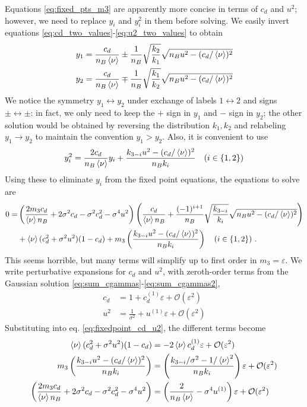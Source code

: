 Equations \eqref{eq:fixed_pts_m3} are apparently more concise in terms of $c_d$ and $u^2$; however, we need to replace $y_i$ and $y_i^2$ in them before solving. We easily invert equations \eqref{eq:cd_two_values}-\eqref{eq:u2_two_values} to obtain
\begin{align}
	y_1 &= \frac{c_d}{n_B \braket{\nu}} \pm \frac{1}{n_B} \sqrt{\frac{k_2}{k_1}}\sqrt{n_B u^2 - (c_d/\braket{\nu})^2}	\label{eq:y1_from_cd_u2} \\
	y_2 &= \frac{c_d}{n_B \braket{\nu}} \mp \frac{1}{n_B} \sqrt{\frac{k_1}{k_2}}\sqrt{n_B u^2 - (c_d/\braket{\nu})^2}	\label{eq:y2_from_cd_u2}
\end{align}
We notice the symmetry $y_1 \leftrightarrow y_2 $ under exchange of labels $1 \leftrightarrow 2$ and signs $\pm \leftrightarrow \pm$: in fact, we only need to keep the $+$ sign in $y_1$ and $-$ sign in $y_2$; the other solution would be obtained by reversing the distribution $k_1, k_2$ and relabeling $y_1 \rightarrow y_2$ to maintain the convention $y_1 > y_2$. 
Also, it is convenient to use
\begin{equation*}
	y_i^2 =	\frac{2 c_d}{n_B \braket{\nu}} y_i + \frac{k_{3-i} u^2 - (c_d / \braket{\nu})^2}{n_B k_i} \quad (i \in \{1, 2\})
\end{equation*}
Using these to eliminate $y_i$ from the fixed point equations, the equations to solve are
\begin{align}
0 =  &\left( \frac{2 m_3 c_d}{\braket{\nu} n_B} + 2\sigma^2 c_d - \sigma^2 c_d^2 - \sigma^4 u^2 \right) \left( \frac{c_d}{\braket{\nu} n_B} + \frac{(-1)^{i+1}}{n_B} \sqrt{\frac{k_{3-i}}{k_i}}\sqrt{n_B u^2 - (c_d / \braket{\nu})^2} \right)  \nonumber \\
	&+ \braket{\nu} (c_d^2 + \sigma^2 u^2)(1-c_d) + m_3 \left(\frac{k_{3-i} u^2 - (c_d/\braket{\nu})^2}{n_B k_i} \right) \quad (i \in \{1, 2\}) \,\, . \label{eq:fixedpoint_cd_u2}
\end{align}
This seems horrible, but many terms will simplify up to first order in $m_3 = \varepsilon$. We write perturbative expansions for $c_d$ and $u^2$, with zeroth-order terms from the Gaussian solution \eqref{eq:sum_cgammas}-\eqref{eq:sum_cgammas2},
\begin{align}
	c_d &= 1 + c_d^{(1)} \varepsilon + \mathcal{O}(\varepsilon^2) 	\label{eq:expansion_cd} \\
	u^2 &= \frac{1}{\sigma^2} + u^{(1)} \varepsilon + \mathcal{O}(\varepsilon^2)	\label{eq:expansion_u2}
\end{align}
Substituting into eq. \eqref{eq:fixedpoint_cd_u2}, the different terms become
\begin{align*}
	\braket{\nu} (c_d^2 + \sigma^2 u^2)(1-c_d) &= -2 \braket{\nu} c_d^{(1)} \varepsilon + \mathcal{O}(\varepsilon^2) 	\\
	m_3 \left(\frac{k_{3-i} u^2 - (c_d/\braket{\nu})^2}{n_B k_i} \right) &= \left(\frac{k_{3-i}/\sigma^2 - 1/\braket{\nu}^2}{n_B k_i} \right) \varepsilon +  \mathcal{O}(\varepsilon^2) \\
	\left( \frac{2 m_3 c_d}{\braket{\nu} n_B} + 2\sigma^2 c_d - \sigma^2 c_d^2 - \sigma^4 u^2 \right) &=	 \left(\frac{2}{n_B \braket{\nu}} - \sigma^4 u^{(1)} \right) \varepsilon + \mathcal{O}(\varepsilon^2)
\end{align*} 
